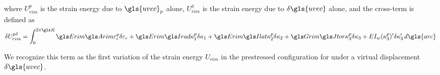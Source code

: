 \documentclass[\rootdir/thesis.tex]{subfiles}
\begin{document}
where $U_{rim}^p$ is the strain energy due to $\gls{uvec}_p$ alone, $U_{rim}^{\delta}$ is the strain energy due to $\delta\gls{uvec}$ alone, and the cross-term is defined as
\begin{equation}
\label{eq:U_rim_pd}
\delta U_{rim}^{p\delta} = \int_0^{2\pi \R}
	\EA\varepsilon_c^p \delta\varepsilon_c +
	\EIr\kappa_1^p\delta\kappa_1 +
	\EIl\kappa_2^p\delta\kappa_2 +
	\GJ\kappa_3^p\delta\kappa_3 +
	EI_w(\kappa_3^p)'\delta\kappa_3'\, d\gls{arc}
\end{equation}

We recognize this term as the first variation of the strain energy $U_{rim}$ in the prestressed configuration for under a virtual displacement $\delta\gls{uvec}$.




\end{document}
